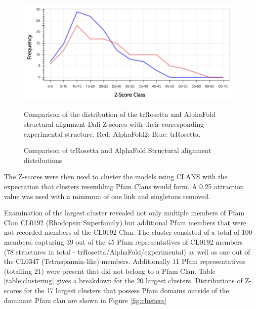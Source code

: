 \begin{figure}[th!]
    \centering
    \includegraphics[width=150mm, scale=0.75]{Pfam/comp2.png}
    \caption{Comparison of trRosetta and AlphaFold Structural alignment distributions}
    \label{fig:comparison2}
    \small
    \begin{flushleft}Comparison of the distribution of the trRosetta and AlphaFold structural alignment Dali Z-scores with their corresponding experimental structure. Red: AlphaFold2; Blue: trRosetta.\end{flushleft}
\end{figure}



The Z-scores were then used to cluster the models using CLANS with the expectation that clusters resembling Pfam Clans would form. A 0.25 attraction value was used with a minimum of one link and singletons removed. 

Examination of the largest cluster revealed not only multiple members of Pfam Clan CL0192 (Rhodopsin Superfamily) but additional Pfam members that were not recorded members of the CL0192 Clan. The cluster consisted of a total of 100 members, capturing 39 out of the 45 Pfam representatives of CL0192 members (78 structures in total - trRosetta/AlphaFold/experimental) as well as one out of the CL0347 (Tetraspannin-like) members.  Additionally 11 Pfam representatives (totalling 21) were present that did not belong to a Pfam Clan. Table \ref{table:clustering} gives a breakdown for the 20 largest clusters. Distributions of Z-scores for the 17 largest clusters that possess Pfam domains outside of the dominant Pfam clan are shown in Figure \ref{fig:clusters}   


